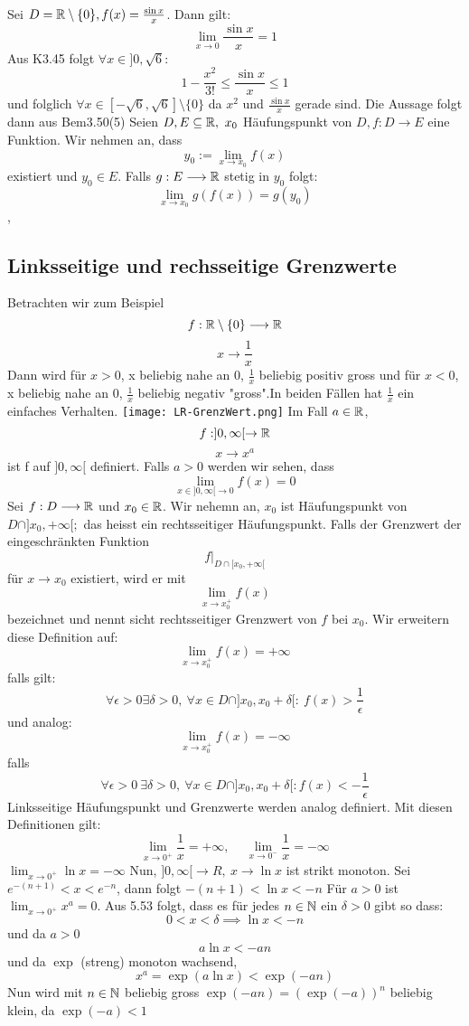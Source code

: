 \Bsp[3.51] Sei \( D = \mathbb{R} \setminus \{0\}, f(x) = \frac{\sin x}{x}\). Dann gilt:
\[ \lim_{ x \rightarrow 0} \frac{\sin x }{x} = 1\]
Aus K3.45 folgt \( \forall x \in ]0, \sqrt{6}:\)
\[ 1-\frac{x^2}{3!} \leq \frac{\sin x}{x} \leq 1\]
und folglich \( \forall x \in [-\sqrt{6}, \sqrt{6}] \setminus \{0\}\) da \( x^2 \) und \( \frac{\sin x}{x}\) gerade sind. Die Aussage folgt dann aus Bem3.50(5)
\Satz[3.52] Seien \(D,E \subseteq \mathbb{R},\  x_0 \) Häufungspunkt von \(D, f: D \longrightarrow E \) eine Funktion. Wir nehmen an, dass
\[y_0 := \lim\limits_{x \rightarrow x_0} f(x)\]
existiert und \(y_0 \in E.\) Falls \(g: E \longrightarrow \mathbb{R} \) stetig in \(y_0\) folgt:
\[ \lim\limits_{x \rightarrow x_0} g(f(x)) = g(y_0)\]
\sep
\subsection{Linksseitige und rechsseitige Grenzwerte}
Betrachten wir zum Beispiel
\[f: \mathbb{R} \setminus \{0\} \longrightarrow \mathbb{R}\]
\[x \longrightarrow \frac{1}{x}\]
Dann wird für \( x > 0\), x beliebig nahe an 0, \(\frac{1}{x}\) beliebig positiv gross und für \(x < 0\), x beliebig nahe an 0, \( \frac{1}{x}\) beliebig negativ "gross".In beiden Fällen hat \( \frac{1}{x}\) ein einfaches Verhalten. \newline
\texttt{[image: LR-GrenzWert.png]} \newline
Im Fall \(a \in \mathbb{R}\),
\[f: ]0,\infty[ \rightarrow \mathbb{R}\]
\[x \rightarrow x^a\]
ist f auf \(]0,\infty[\) definiert. Falls \(a > 0\) werden wir sehen, dass
\[ \lim_{x\in ]0,\infty[\rightarrow 0} f(x) = 0\]
Sei \(f: D \longrightarrow \mathbb{R} \) und \(x_0 \in \mathbb{R} \). Wir nehemn an, \(x_0\) ist Häufungspunkt von \(D \cap ]x_0, +\infty[;\)
das heisst ein rechtsseitiger Häufungspunkt. Falls der Grenzwert der eingeschränkten Funktion
\[f|_{D \cap [x_0,+\infty[}\]
für \(x \longrightarrow x_0\) existiert, wird er mit
\[ \lim_{x \rightarrow x_0^+} f(x)\]
bezeichnet und nennt sicht rechtsseitiger Grenzwert von \(f\) bei \(x_0\).\newline \newline
Wir erweitern diese Definition auf:
\[\lim_{x \rightarrow x_0^+} f(x) = +\infty \]
falls gilt:
\[ \forall \epsilon > 0 \exists \delta > 0, \ \forall x \in D \cap ]x_0,x_0 + \delta[:\ f(x) > \frac{1}{\epsilon}\]
und analog:
\[ \lim_{x \rightarrow x_0^+} f(x) = -\infty \]
falls
\[ \forall \epsilon > 0 \  \exists \delta > 0, \ \forall x \in D \cap ]x_0,x_0+\delta[: f(x) < -\frac{1}{\epsilon}\]
Linksseitige Häufungspunkt und Grenzwerte werden analog definiert. Mit diesen Definitionen gilt:
\[\lim_{x \rightarrow 0^+}\frac{1}{x} = +\infty, \quad\ \lim_{x \rightarrow 0^-}\frac{1}{x} = -\infty \]
\Bsp[3.53] \( \lim_{x \rightarrow 0^+} \ln x = -\infty\)
Nun, \(]0,\infty[ \rightarrow R, \ x \rightarrow \ln x\) ist strikt monoton. Sei \( e^{-(n+1)} < x < e^{-n}\), dann folgt \(-(n+1) < \ln x < -n\) 
\Bsp[3.54] Für \( a > 0\) ist \( \lim_{x \rightarrow 0^+} x^a =0.\) Aus 5.53 folgt, dass es für jedes \(n \in \mathbb{N}\) ein \( \delta > 0\) gibt so dass:
\[ 0 < x < \delta \implies \ln x < -n\]
und da \( a > 0\)
\[ a \ln x < -an\]
und da \( \exp \) (streng) monoton wachsend,
\[ x^a = \exp(a \ln x) < \exp(-an)\]
Nun wird mit \(n \in \mathbb{N}\) beliebig gross \( \exp(-an) = (\exp(-a))^n\) beliebig klein, da \(\exp(-a) < 1\)